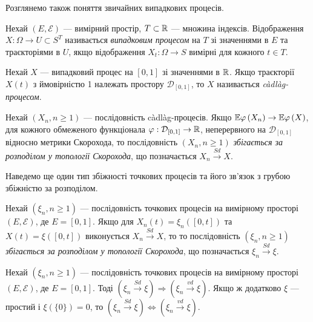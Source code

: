 Розглянемо також поняття звичайних випадкових процесів.

\begin{definition}
    Нехай $\left(E, \mathcal{E}\right)$ --- вимірний простір,
    $T \subset \mathbb{R}$ --- множина індексів. Відображення
    $X : \Omega \to U \subset S^T$ називається \emph{випадковим процесом}
    на $T$ зі значеннями в $E$ та траєкторіями в $U$,
    якщо відображення $X_t : \Omega \to S$ вимірні для кожного $t \in T$.
\end{definition}

\begin{definition}
    Нехай $X$ --- випадковий процес на $[0, 1]$ зі значеннями в $\mathbb{R}$. Якщо
    траєкторії $X(t)$ з ймовірністю 1 належать простору $\mathcal{D}_{[0, 1]}$,
    то $X$ називається \emph{càdlàg-процесом}.
\end{definition}

\begin{definition}
    Нехай $\left(X_n, n \geq 1\right)$ --- послідовність
    càdlàg-процесів. Якщо 
    $\mathbb{E} \varphi \left(X_n\right) \to \mathbb{E} \varphi \left(X\right)$,
    для кожного обмеженого функціонала
    $\varphi: \mathcal{D}_{[0, 1]} \to \mathbb{R}$, 
    неперервного на $\mathcal{D}_{[0, 1]}$ 
    відносно метрики Скорохода,
    то послідовність $\left(X_n, n \geq 1\right)$
    \emph{збігається за розподілом у топології Скорохода},
    що позначається
    $X_n \overset{Sd}{\longrightarrow} X$.
\end{definition}

Наведемо ще один тип збіжності точкових процесів та його зв'язок
з грубою збіжністю за розподілом.

\begin{definition}
    Нехай $\left(\xi_n, n \geq 1\right)$ --- послідовність 
    точкових процесів на вимірному просторі $\left(E, \mathcal{E}\right)$,
    де $E = [0, 1]$.
    Якщо для $X_n (t) = \xi_n \left([0, t]\right)$ та
    $X (t) = \xi \left([0, t]\right)$ виконується
    $X_n \overset{Sd}{\longrightarrow} X$, то
    то послідовність $\left(\xi_n, n \geq 1\right)$
    \emph{збігається за розподілом у топології Скорохода}, 
    що позначається
    $\xi_n \overset{Sd}{\longrightarrow} \xi$.
\end{definition}

\begin{theorem}\label{th:Skorohod_conv}
    Нехай $\left(\xi_n, n \geq 1\right)$ --- послідовність 
    точкових процесів на вимірному просторі $\left(E, \mathcal{E}\right)$,
    де $E = [0, 1]$.
    Тоді 
    $\left(\xi_n \overset{Sd}{\longrightarrow} \xi\right) \Rightarrow \left(\xi_n \overset{vd}{\longrightarrow} \xi\right)$. 
    Якщо ж
    додатково $\xi$ --- простий і $\xi\left(\{ 0\}\right) = 0$, 
    то
    $\left(\xi_n \overset{Sd}{\longrightarrow} \xi\right) \Leftrightarrow \left(\xi_n \overset{vd}{\longrightarrow} \xi\right)$. 
\end{theorem}